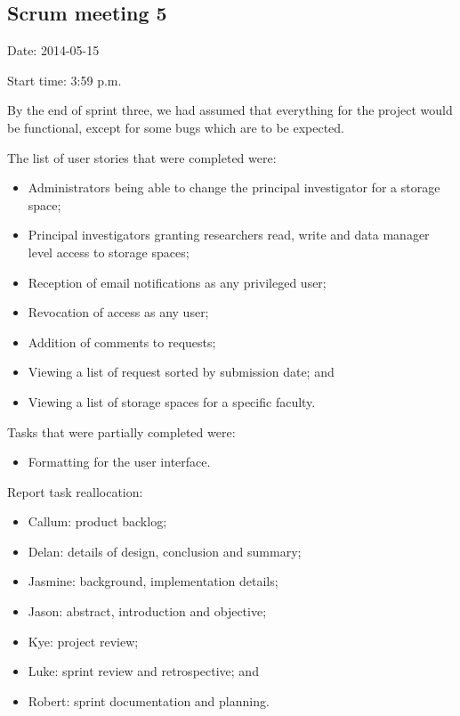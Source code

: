 \documentclass[a4paper,titlepage,12pt]{article}
\begin{document}
\subsection{Scrum meeting 5}

Date: 2014-05-15

Start time: 3:59 p.m.

By the end of sprint three, we had assumed that everything for the project
would be functional, except for some bugs which are to be expected.

The list of user stories that were completed were:

\begin{itemize}
	\item Administrators being able to change the principal investigator
	      for a storage space;
	\item Principal investigators granting researchers read, write and data
	      manager level access to storage spaces;
	\item Reception of email notifications as any privileged user;
	\item Revocation of access as any user;
	\item Addition of comments to requests;
	\item Viewing a list of request sorted by submission date; and
	\item Viewing a list of storage spaces for a specific faculty.
\end{itemize}

Tasks that were partially completed were:

\begin{itemize}
	\item Formatting for the user interface.
\end{itemize}

Report task reallocation:

\begin{itemize}
	\item Callum: product backlog;
	\item Delan: details of design, conclusion and summary;
	\item Jasmine: background, implementation details;
	\item Jason: abstract, introduction and objective;
	\item Kye: project review;
	\item Luke: sprint review and retrospective; and
	\item Robert: sprint documentation and planning.
\end{itemize}
\end{document}

